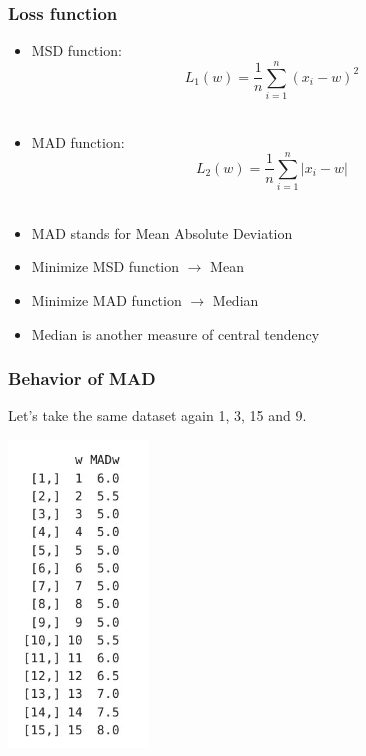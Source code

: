 \documentclass{beamer}\usepackage[]{graphicx}\usepackage[]{color}
\begin{document}
\begin{frame}

\frametitle{Loss function}
\begin{itemize}
\item MSD function: $$L_1(w)=\frac{1}{n}\sum_{i=1}^{n} (x_i-w)^2$$ \\
\item MAD function: $$L_2(w)= \frac{1}{n}\sum_{i=1}^{n} |x_i-w|$$ \\

\item MAD stands for Mean Absolute Deviation
\item Minimize MSD function $\rightarrow$ Mean \pause
\item Minimize MAD function $\rightarrow$ Median \pause
\item Median is another measure of central tendency

\end{itemize}
\end{frame}


\begin{frame}

\frametitle{Behavior of MAD}
Let's take the same dataset again 1, 3, 15 and 9.
\begin{center}
\includegraphics[width = 0.28\textwidth, keepaspectratio]{madtable.jpeg} 
\end{center}
\end{frame}
\end{document}
